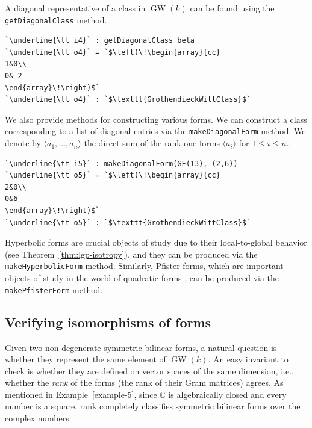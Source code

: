 \documentclass[12pt]{amsart}
\theoremstyle{definition}
\DeclareMathOperator{\GW}{GW}
\begin{document}
A diagonal representative of a class in $\GW(k)$ can be found using the \texttt{getDiagonalClass} method. 

\begin{lstlisting}[language=Macaulay2output]
`\underline{\tt i4}` : getDiagonalClass beta
`\underline{\tt o4}` = `$\left(\!\begin{array}{cc}
1&0\\
0&-2
\end{array}\!\right)$`
`\underline{\tt o4}` : `$\texttt{GrothendieckWittClass}$`
\end{lstlisting}

We also provide methods for constructing various forms. We can construct a class corresponding to a list of diagonal entries via the \texttt{makeDiagonalForm} method. We denote by $\langle a_1,\ldots,a_n\rangle$ the direct sum of the rank one forms $\langle a_i\rangle$ for $1\le i \le n$.

\begin{lstlisting}[language=Macaulay2output]
`\underline{\tt i5}` : makeDiagonalForm(GF(13), (2,6))
`\underline{\tt o5}` = `$\left(\!\begin{array}{cc}
2&0\\
0&6
\end{array}\!\right)$`
`\underline{\tt o5}` : `$\texttt{GrothendieckWittClass}$`
\end{lstlisting}

Hyperbolic forms are crucial objects of study due to their local-to-global behavior (see Theorem~\ref{thm:lgp-isotropy}), and they can be produced via the \texttt{makeHyperbolicForm} method. Similarly, Pfister forms, which are important objects of study in the world of quadratic forms \cite[Chapter~X]{Lam}, can be produced via the \texttt{makePfisterForm} method.

\subsection{Verifying isomorphisms of forms}\label{subsec: isomorphisms of forms}
Given two non-degenerate symmetric bilinear forms, a natural question is whether they represent the same element of $\GW(k)$. An easy invariant to check is whether they are defined on vector spaces of the same dimension, i.e., whether the \emph{rank} of the forms (the rank of their Gram matrices) agrees. As mentioned in Example~\ref{example-5}, since $\mathbb{C}$ is algebraically closed and every number is a square, rank completely classifies symmetric bilinear forms over the complex numbers. 
\end{document}
